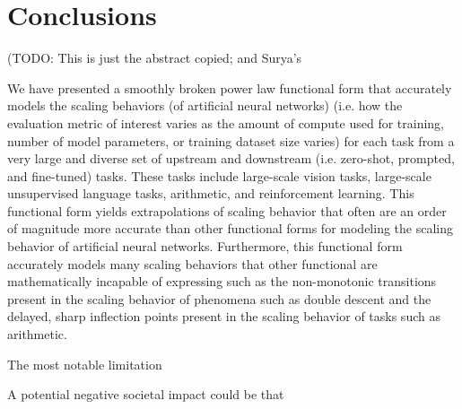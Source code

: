 \section{Conclusions}

(TODO: This is just the abstract copied; and Surya's

We have presented a smoothly broken power law functional form that accurately models the scaling behaviors (of artificial neural networks) (i.e. how the evaluation metric of interest varies as the amount of compute used for training, number of model parameters, or training dataset size varies) for each task from a very large and diverse set of upstream and downstream (i.e. zero-shot, prompted, and fine-tuned) tasks. These tasks include large-scale vision tasks, large-scale unsupervised language tasks, arithmetic, and reinforcement learning. This functional form yields extrapolations of scaling behavior that often are an order of magnitude more accurate than other functional forms for modeling the scaling behavior of artificial neural networks. Furthermore, this functional form accurately models many scaling behaviors that other functional are mathematically incapable of expressing such as the non-monotonic transitions present in the scaling behavior of phenomena such as double descent and the delayed, sharp inflection points present in the scaling behavior of tasks such as arithmetic.

 The most notable limitation   

 A potential negative societal impact could be that  

 